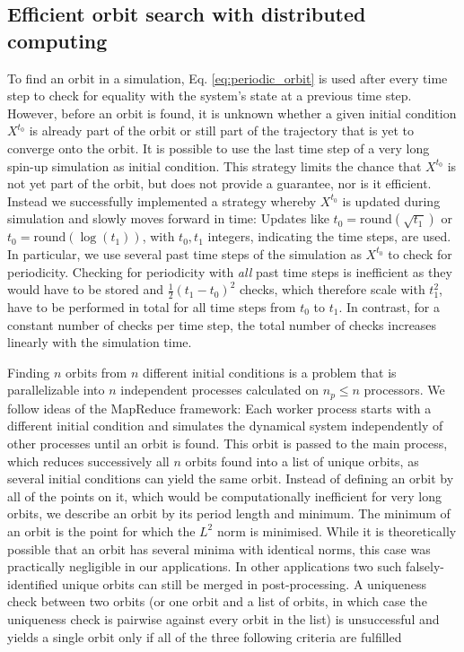 \subsection{Efficient orbit search with distributed computing}
\label{sec:distributed_orbit_search}

To find an orbit in a simulation, Eq. \ref{eq:periodic_orbit} is used after every time step to check for equality with the
system's state at a previous time step. However, before an orbit is found, it is unknown whether a given initial condition $X^{t_0}$
is already part of the orbit or still part of the trajectory that is yet to converge onto the orbit. It is possible to use the last time step
of a very long spin-up simulation as initial condition. This strategy limits the chance that $X^{t_0}$ is not yet part of the orbit,
but does not provide a guarantee, nor is it efficient. Instead we successfully implemented a strategy whereby $X^{t_0}$ is updated
during simulation and slowly moves forward in time: Updates like $t_0 = \mathrm{round}(\sqrt{t_1})$ or $t_0 = \mathrm{round}(\log(t_1))$,
with $t_0,t_1$  integers, indicating the time steps, are used. In particular, we use several past time steps of the simulation as $X^{t_0}$
to check for periodicity. Checking for periodicity with \emph{all} past time steps is inefficient as they would have to be stored and
$\tfrac{1}{2}(t_1-t_0)^2$ checks, which therefore scale with $t_1^2$, have to be performed in total for all time steps from $t_0$ to $t_1$.
In contrast, for a constant number of checks per time step, the total number of checks increases linearly with the simulation time.

Finding $n$ orbits from $n$ different initial conditions is a problem that is parallelizable into $n$  independent processes calculated
on $n_p \leq n$  processors. We follow ideas of the MapReduce framework: Each worker process starts with a different initial condition
and simulates the dynamical system independently of other processes until an orbit is found. This orbit is passed to the main process,
which reduces successively all $n$ orbits found into a list of unique orbits, as several initial conditions can yield the same orbit.
Instead of defining an orbit by all of the points on it, which would be computationally inefficient for very long orbits, we describe
an orbit by its period length and minimum. The minimum of an orbit is the point for which the $L^2$ norm is minimised.  While it is
theoretically possible that an orbit has several minima with identical norms, this case was practically negligible in our applications.
In other applications two such falsely-identified unique orbits can still be merged in post-processing.
A uniqueness check between two orbits (or one orbit and a list of orbits, in which case the uniqueness check is pairwise against every
orbit in the list) is unsuccessful and yields a single orbit only if all of the three following criteria are fulfilled

